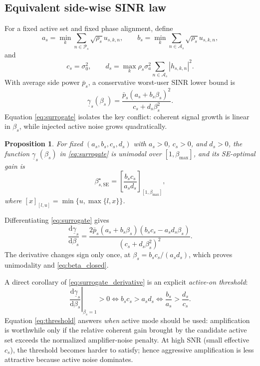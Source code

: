 \documentclass[journal]{IEEEtran}
\newtheorem{proposition}{Proposition}
\begin{document}
\subsection{Equivalent side-wise SINR law}
For a fixed active set and fixed phase alignment, define
\begin{equation}
a_s=\min_k \sum_{n\in\mathcal{P}_s}\sqrt{\rho_s}u_{s,k,n},\qquad
b_s=\min_k \sum_{n\in\mathcal{A}_s}\sqrt{\rho_s}u_{s,k,n},
\label{eq:ab}
\end{equation}
and
\begin{equation}
c_s=\sigma_0^2,\qquad
d_s=\max_k \rho_s\sigma_a^2\sum_{n\in\mathcal{A}_s}|h_{s,k,n}|^2.
\label{eq:cd}
\end{equation}
With average side power $\bar{p}_s$, a conservative worst-user SINR lower bound is
\begin{equation}
\underline{\gamma}_s(\beta_s)=
\frac{\bar{p}_s(a_s+b_s\beta_s)^2}{c_s+d_s\beta_s^2}.
\label{eq:surrogate}
\end{equation}
Equation \eqref{eq:surrogate} isolates the key conflict: coherent signal growth is linear in $\beta_s$, while injected active noise grows quadratically.

\begin{proposition}
For fixed $(a_s,b_s,c_s,d_s)$ with $a_s>0$, $c_s>0$, and $d_s>0$, the function $\underline{\gamma}_s(\beta_s)$ in \eqref{eq:surrogate} is unimodal over $[1,\beta_{\max}]$, and its SE-optimal gain is
\begin{equation}
\beta_{s,\mathrm{SE}}^\star=
\left[\frac{b_sc_s}{a_sd_s}\right]_{[1,\beta_{\max}]},
\label{eq:beta_closed}
\end{equation}
where $[x]_{[l,u]}=\min\{u,\max\{l,x\}\}$.
\end{proposition}

\begin{IEEEproof}
Differentiating \eqref{eq:surrogate} gives
\begin{equation}
\frac{\mathrm{d}\underline{\gamma}_s}{\mathrm{d}\beta_s}=
\frac{2\bar{p}_s(a_s+b_s\beta_s)(b_sc_s-a_sd_s\beta_s)}{(c_s+d_s\beta_s^2)^2}.
\label{eq:surrogate_derivative}
\end{equation}
The derivative changes sign only once, at $\beta_s=b_sc_s/(a_sd_s)$, which proves unimodality and \eqref{eq:beta_closed}.
\end{IEEEproof}

A direct corollary of \eqref{eq:surrogate_derivative} is an explicit \emph{active-on threshold}:
\begin{equation}
\left.\frac{\mathrm{d}\underline{\gamma}_s}{\mathrm{d}\beta_s}\right|_{\beta_s=1}>0
\iff b_sc_s>a_sd_s
\iff \frac{b_s}{a_s}>\frac{d_s}{c_s}.
\label{eq:threshold}
\end{equation}
Equation \eqref{eq:threshold} answers \emph{when} active mode should be used: amplification is worthwhile only if the relative coherent gain brought by the candidate active set exceeds the normalized amplifier-noise penalty. At high SNR (small effective $c_s$), the threshold becomes harder to satisfy; hence aggressive amplification is less attractive because active noise dominates.
\end{document}
